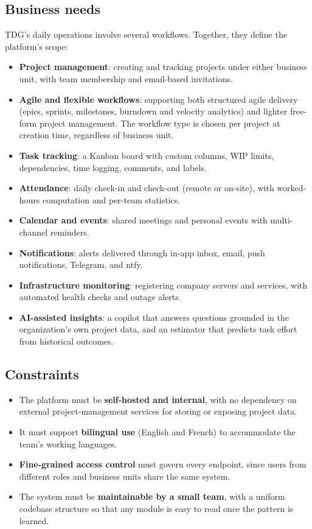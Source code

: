 \subsection{Business needs}

TDG's daily operations involve several workflows. Together, they define the platform's scope:

\begin{itemize}
  \item \textbf{Project management}: creating and tracking projects under either business unit,
    with team membership and email-based invitations.
  \item \textbf{Agile and flexible workflows}: supporting both structured agile delivery (epics,
    sprints, milestones, burndown and velocity analytics) and lighter free-form project
    management. The workflow type is chosen per project at creation time, regardless of
    business unit.
  \item \textbf{Task tracking}: a Kanban board with custom columns, WIP limits, dependencies,
    time logging, comments, and labels.
  \item \textbf{Attendance}: daily check-in and check-out (remote or on-site), with worked-hours
    computation and per-team statistics.
  \item \textbf{Calendar and events}: shared meetings and personal events with multi-channel
    reminders.
  \item \textbf{Notifications}: alerts delivered through in-app inbox, email, push notifications,
    Telegram, and ntfy.
  \item \textbf{Infrastructure monitoring}: registering company servers and services, with
    automated health checks and outage alerts.
  \item \textbf{AI-assisted insights}: a copilot that answers questions grounded in the
    organization's own project data, and an estimator that predicts task effort from historical
    outcomes.
\end{itemize}

\subsection{Constraints}

\begin{itemize}
  \item The platform must be \textbf{self-hosted and internal}, with no dependency on external
    project-management services for storing or exposing project data.
  \item It must support \textbf{bilingual use} (English and French) to accommodate the team's
    working languages.
  \item \textbf{Fine-grained access control} must govern every endpoint, since users from
    different roles and business units share the same system.
  \item The system must be \textbf{maintainable by a small team}, with a uniform codebase
    structure so that any module is easy to read once the pattern is learned.
\end{itemize}

